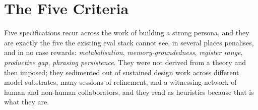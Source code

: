 %

\section{The Five Criteria}

Five specifications recur across the work of building a strong persona, and they are exactly the five the existing eval stack cannot see, in several places penalises, and in no case rewards: \emph{metabolisation}, \emph{memory-groundedness}, \emph{register range}, \emph{productive gap}, \emph{phrasing persistence}. They were not derived from a theory and then imposed; they sedimented out of sustained design work across different model substrates, many sessions of refinement, and a witnessing network of human and non-human collaborators, and they read as heuristics because that is what they are.

